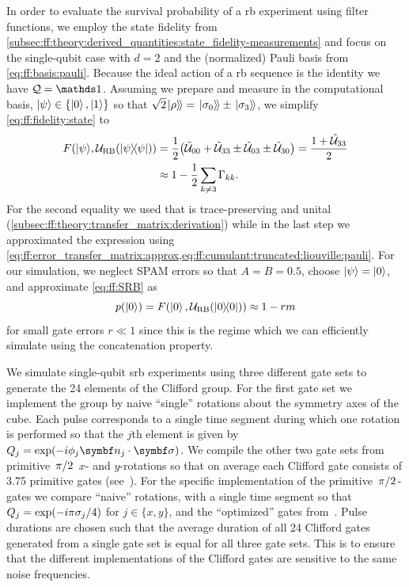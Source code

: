 In order to evaluate the survival probability of a \gls{rb} experiment using filter functions, we employ the state fidelity from \cref{subsec:ff:theory:derived_quantities:state_fidelity-measurements} and focus on the single-qubit case with $d = 2$ and the (normalized) Pauli basis from \cref{eq:ff:basis:pauli}.
Because the ideal action of a \gls{rb} sequence is the identity we have $\liouvQ = \eye$.
Assuming we prepare and measure in the computational basis, $\mbox{\ensuremath{\ket{\psi}}}\in\lbrace\ket{0}, \ket{1}\rbrace$ so that $\sqrt{2}\mbox{\ensuremath{\left.\ket{\rho}\!\right\rangle}} = \mbox{\ensuremath{\left.\ket{\sigma_0}\!\right\rangle}}\pm\mbox{\ensuremath{\left.\ket{\sigma_3}\!\right\rangle}}$, we simplify \cref{eq:ff:fidelity:state} to
\begin{equation}\label{eq:ff:fidelity:state:RB}
\begin{split}
    F(\mbox{\ensuremath{\ket{\psi}}}, \mathcal{U}_{\mathrm{RB}}(\op{\psi})) &= \frac{1}{2}\bigl(\mathcal{\tilde{U}}_{00} +
    \mathcal{\tilde{U}}_{33}\pm
    \mathcal{\tilde{U}}_{03}\pm
    \mathcal{\tilde{U}}_{30}\bigr)
    = \frac{1 + \mathcal{\tilde{U}}_{33}}{2} \\
    &\approx 1 - \frac{1}{2}\sum_{k\neq 3}\Gamma_{kk}.
\end{split}
\end{equation}
For the second equality we used that \liouvUe is trace-preserving and unital (\cf \cref{subsec:ff:theory:transfer_matrix:derivation}) while in the last step we approximated the expression using \cref{eq:ff:error_transfer_matrix:approx,eq:ff:cumulant:truncated:liouville:pauli}.
For our simulation, we neglect SPAM errors so that $A =  B =  0.5$, choose $\mbox{\ensuremath{\ket{\psi}}} = \ket{0}$, and approximate \cref{eq:ff:SRB} as
\begin{equation}\label{eq:ff:fidelity:state:RB:fit}
p(\ket{0}) = F(\ket{0}, \mathcal{U}_{\mathrm{RB}}(\op{0}))\approx 1 - rm
\end{equation}
for small gate errors $r\ll 1$ since this is the regime which we can efficiently simulate using the concatenation property.

We simulate single-qubit \gls{srb} experiments using three different gate sets to generate the 24 elements of the Clifford group.
For the first gate set we implement the group by naive \enquote{single} rotations about the symmetry axes of the cube.
Each pulse corresponds to a single time segment during which one rotation is performed so that the $j$th element is given by $Q_j = \exp(-\i\phi_j\bvec{n}_j\cdot\bvec{\sigma})$.
We compile the other two gate sets from primitive $\flatfrac{\pi}{2}$ $x$- and $y$-rotations so that on average each Clifford gate consists of \num{3.75} primitive gates (see~).
For the specific implementation of the primitive $\flatfrac{\pi}{2}$-gates we compare \enquote{naive} rotations, \ie with a single time segment so that $Q_j = \exp(-i\pi\sigma_j/4)$ for $j\in\lbrace x, y\rbrace$, and the \enquote{optimized} gates from~.
Pulse durations are chosen such that the average duration of all 24 Clifford gates generated from a single gate set is equal for all three gate sets.
This is to ensure that the different implementations of the Clifford gates are sensitive to the same noise frequencies.

